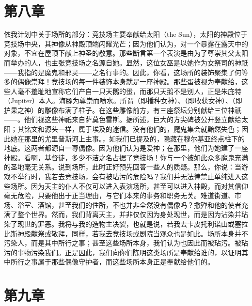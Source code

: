 \section{第八章}

依我计划中关于场所的部分：竞技场主要奉献给太阳（the Sun），太阳的神殿位于竞技场中央，其神像从神殿顶端闪耀光芒；因为他们认为，对一个暴露在露天中的对象，不宜在屋顶下献上神圣的敬意。那些断言第一个表演是由为了尊崇其父太阳而举办的人，也主张竞技场之名源自她。显然，这位女巫是以她作为女祭司的神祇——我指的是魔鬼和邪灵——之名行事的。因此，你看，这场所的装饰聚集了何等多的偶像崇拜！竞技场的每一件装饰本身就是一座神殿。那些蛋被视为奉献给，这些人毫不羞耻地宣称它们产自一只天鹅的蛋，而那只天鹅不是别人，正是朱庇特（Jupiter）本人。海豚为尊崇而喷水。所谓（即播种女神）、（即收获女神）、（即护果之神）的雕像布满了柱子。在这些雕像前方，有三座祭坛分别献给三位神祇——。他们视这些神祇来自萨莫色雷斯。据所述，巨大的方尖碑被公开竖立献给太阳；其铭文和源头一样，属于埃及的迷信。没有他们的，魔鬼集会就黯然失色；因此她在那里的尤里普斯河上主事。，如我们已提及的，隐藏在穆尔基亚终点柱下的地底。这两者都源自一尊偶像。因为他们认为是爱神；在那里，他们为她建了一座神殿。看啊，基督徒，多少不洁之名占据了竞技场！你与一个被如此众多魔鬼充满的圣地毫无关系。说到场所，此时正好预先回答一些人的质疑。那么，你说：当游戏不举行时，我若去竞技场，会有被玷污的危险吗？我们并无法律禁止单纯进入这些场所。因为天主的仆人不仅可以进入表演场所，甚至可以进入神殿，而对其信仰毫无危险，只要他出于正当理由，与它们本来的事务和职务无关。难道街道、市场、浴室、酒馆，甚至我们的住所，不也并非全然没有偶像吗？撒殚和他的使者充满了整个世界。然而，我们背离天主，并非仅仅因为身处现世，而是因为沾染并玷染了现世的罪恶。我将与我的造物主决裂，也就是说，若我去卡皮托利诺山或塞拉比斯神殿献祭或敬拜，同样，若我去竞技场或剧院当观众也是如此。场所本身并不污染人，而是其中所行之事；甚至这些场所本身，我们认为也因此而被玷污。被玷污的事物污染我们。正是因此，我们向你们陈明这类场所是奉献给谁的，以证明其中所行之事属于那些偶像守护者，而这些场所本身正是奉献给他们的。\par


\section{第九章}


